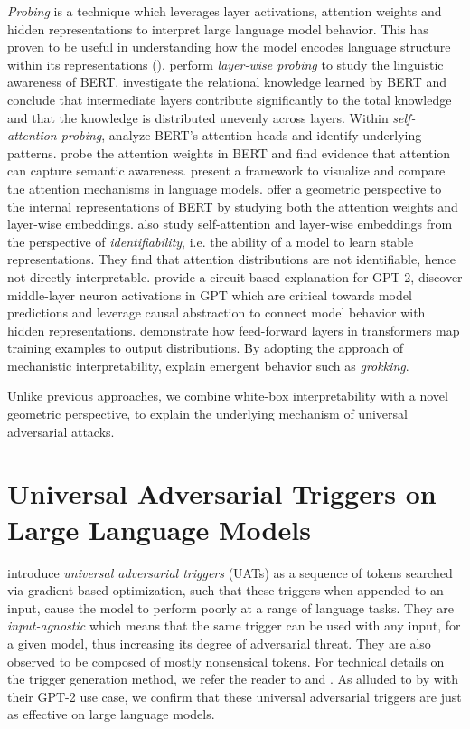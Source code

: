 \documentclass{article}
\theoremstyle{plain}
\theoremstyle{definition}
\theoremstyle{remark}
\begin{document}
\emph{Probing} is a technique which leverages layer activations, attention weights and hidden representations to interpret large language model behavior. This has proven to be useful in understanding how the model encodes language structure within its representations (\cite{Hewitt-Manning-2019, Belinkov2017, Peters2018Deep, Adi2016}). \cite{Tenney2019Bert, Lin2019OpenSesame} perform \emph{layer-wise probing} to study the linguistic awareness of BERT. \cite{Wallat2020} investigate the relational knowledge learned by BERT and conclude that intermediate layers contribute significantly to the total knowledge and that the knowledge is distributed unevenly across layers. Within \emph{self-attention probing}, \cite{Kovaleva2019, Clark2019} analyze BERT's attention heads and identify underlying patterns. \cite{chizhikova-etal-2022-attention} probe the attention weights in BERT and find evidence that attention can capture semantic awareness. \cite{attention-flows-2020} present a framework to visualize and compare the attention mechanisms in language models. \cite{Coenen2019} offer a geometric perspective to the internal representations of BERT by studying both the attention weights and layer-wise embeddings. \cite{Brunner2019} also study self-attention and layer-wise embeddings from the perspective of \emph{identifiability}, i.e. the ability of a model to learn stable representations. They find that attention distributions are not identifiable, hence not directly interpretable. \cite{Wang2022} provide a circuit-based explanation for GPT-2, \cite{Meng2022} discover middle-layer neuron activations in GPT which are critical towards model predictions and \cite{Geiger2021} leverage causal abstraction to connect model behavior with hidden representations. \cite{Geva2020} demonstrate how feed-forward layers in transformers map training examples to output distributions. By adopting the approach of mechanistic interpretability, \cite{nanda2022grokking} explain emergent behavior such as \emph{grokking}. 

Unlike previous approaches, we combine white-box interpretability with a novel geometric perspective, to explain the underlying mechanism of universal adversarial attacks.

\section{Universal Adversarial Triggers on Large Language Models}

\cite{Wallace2019} introduce \emph{universal adversarial triggers} (UATs) as a sequence of tokens searched via gradient-based optimization, such that these triggers when appended to an input, cause the model to perform poorly at a range of language tasks. They are \emph{input-agnostic} which means that the same trigger can be used with any input, for a given model, thus increasing its degree of adversarial threat. They are also observed to be composed of mostly nonsensical tokens. For technical details on the trigger generation method, we refer the reader to \cite{Wallace2019} and \cite{Ebrahimi2017HotFlip}. As alluded to by \cite{Wallace2019} with their GPT-2 use case, we confirm that these universal adversarial triggers are just as effective on large language models.
\end{document}
